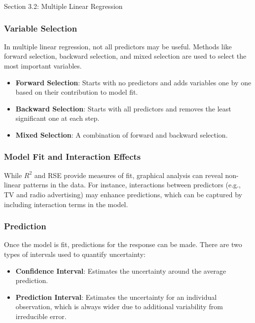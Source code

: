 \begin{notes}{Section 3.2: Multiple Linear Regression}
    \subsubsection*{Variable Selection}
    
    In multiple linear regression, not all predictors may be useful. Methods like forward selection, backward selection, and mixed selection are used to select the most important variables.
    
    \begin{highlight}
        \begin{itemize}
            \item \textbf{Forward Selection}: Starts with no predictors and adds variables one by one based on their contribution to model fit.
            \item \textbf{Backward Selection}: Starts with all predictors and removes the least significant one at each step.
            \item \textbf{Mixed Selection}: A combination of forward and backward selection.
        \end{itemize}
    \end{highlight}
    
    \subsubsection*{Model Fit and Interaction Effects}
    
    While $R^2$ and RSE provide measures of fit, graphical analysis can reveal non-linear patterns in the data. For instance, interactions between predictors (e.g., TV and radio advertising) may 
    enhance predictions, which can be captured by including interaction terms in the model.
    
    \subsubsection*{Prediction}
    
    Once the model is fit, predictions for the response can be made. There are two types of intervals used to quantify uncertainty:
    \begin{itemize}
        \item \textbf{Confidence Interval}: Estimates the uncertainty around the average prediction.
        \item \textbf{Prediction Interval}: Estimates the uncertainty for an individual observation, which is always wider due to additional variability from irreducible error.
    \end{itemize}
\end{notes}

